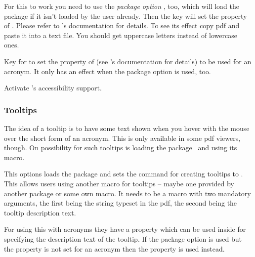\documentclass{acro-manual}
\begin{document}
For this to work you need to use the \emph{package option} ,
too, which will load the package  if it isn't loaded by the user
already.  Then the key  will set the 
property of .  Please refer to 's documentation
for details.  To see its effect copy \ac{pdf} and paste it into a text file.
You should get uppercase letters instead of lowercase ones.

\begin{properties}
    Key for  to set the  property of
     (see 's documentation for details) to be
    used for an acronym.  It only has an effect when the package option
     is used, too.
\end{properties}
\begin{options}
    Activate \acro's accessibility support.
\end{options}

\subsubsection{Tooltips}

The idea of a tooltip is to have some text shown when you hover with the
mouse over the short form of an acronym.  This is only available in some
\acs{pdf} viewers, though.  On possibility for such tooltips is loading the
 package~\cite{pkg:pdfcomment} and using its 
macro.

\begin{options}
    This options loads the  package and sets
    the command for creating tooltips to .
    This allows users using another macro for tooltips --
    maybe one provided by another package or some own macro.  It needs to be a
    macro with two mandatory arguments, the first being the string typeset in
    the \acs{pdf}, the second being the tooltip description text.
\end{options}

For using this with acronyms they have a property  which can
be used inside  for specifying the description text of the
tooltip.  If the  package option is used but the property is
not set for an acronym then the  property is used instead.
\end{document}
